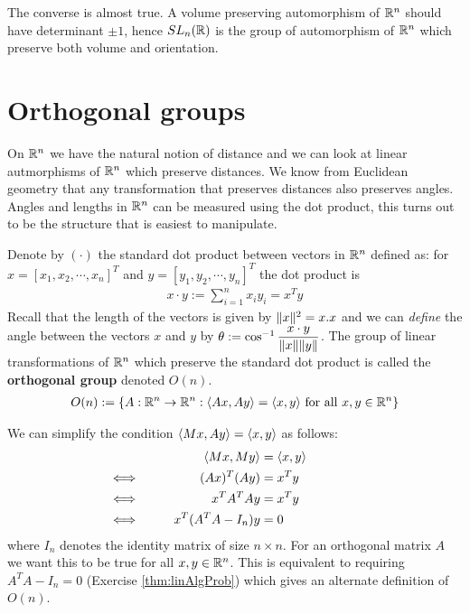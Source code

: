 The converse is almost true. A volume preserving automorphism of $\mathbb{R}^n$ should have determinant $\pm 1$, hence $SL_n(\mathbb{R})$ is the group of automorphism of $\mathbb{R}^n$ which preserve both {volume} and {orientation}.








\section{Orthogonal groups}
On $\mathbb{R}^n$ we have the natural notion of distance and we can look at linear autmorphisms of $\mathbb{R}^n$ which preserve distances. We know from Euclidean geometry that any transformation that preserves distances also preserves angles. Angles and lengths in $\mathbb{R}^n$ can be measured using the dot product, this turns out to be the structure that is easiest to manipulate.

Denote by $(\cdot)$ the standard dot product between vectors in $\mathbb{R}^n$ defined as: for $ x = [x_1, x_2, \cdots, x_n]^T$ and $ y = [y_1, y_2, \cdots, y_n]^T$ the dot product is
\begin{align}
	x \cdot  y := \sum \limits _{i=1}^n x_i y_i =  x ^ T  y
\end{align}
Recall that the length of the vectors is given by $\lVert  x \rVert^2 = { x.  x}$ and we can \emph{define} the angle between the vectors $ x$ and $ y$ by $\theta := \cos^{-1}\dfrac{ x \cdot  y}{\lVert  x \rVert \lVert  y \rVert}$. The group of linear transformations of $\mathbb{R}^n$ which preserve the standard dot product is called the \textbf{orthogonal group} denoted $O(n)$.
\begin{align}
	O(n) := \{ A : \mathbb{R}^n \rightarrow \mathbb{R}^n : \langle A  x, A  y \rangle = \langle  x,  y \rangle \mbox{ for all }  x,  y \in \mathbb{R}^n\}
\end{align}

We can simplify the condition $\langle M  x, A  y \rangle = \langle  x,  y \rangle$ as follows:
\begin{alignat}{4}
	  &   & \langle M  x, M  y \rangle
	& = \langle  x,  y \rangle   \qquad \qquad\\
	\Longleftrightarrow \qquad
	  &   &
	(A  x)^T (A  y)
	& =  x ^ T  y         \qquad \qquad\\
	\Longleftrightarrow  \qquad
	  &   &
	x ^ T A^T A y
	& =  x ^ T  y         \qquad \qquad\\
	\Longleftrightarrow \qquad
	  &   &
	x ^ T (A^T A- I_{n}) y
	& = 0 \qquad \qquad
\end{alignat}
where $I _ {n}$ denotes the identity matrix of size $n \times n$. For an orthogonal matrix $A$ we want this to be true for all $ x,  y \in \mathbb{R}^n$. This is equivalent to requiring $A^T A - I_{n} = 0$ (Exercise \ref{thm:linAlgProb}) which gives an alternate definition of $O(n)$.

